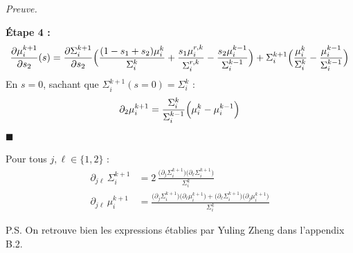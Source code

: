\documentclass[12pt]{article}
\renewcommand{\qedsymbol}{$\blacksquare$}
\renewenvironment{proof}[1][\proofname]{%
  \par\medskip\noindent
  \textit{\color{proofgray}#1.}\enspace\ignorespaces
}{\hfill\qedsymbol\par\medskip}
\renewcommand{\proofname}{Preuve}
\begin{document}
\begin{proof}
\noindent\textbf{Étape 4 :}
\begin{equation*}
\frac{\partial \mu_i^{k+1}}{\partial s_2}(s) = \frac{\partial \Sigma_i^{k+1}}{\partial s_2} \Bigl( 
    \frac{(1-s_1+s_2)\mu_i^k}{\Sigma_i^{k}} + \frac{s_1\mu_i^{r,k}}{\Sigma_i^{r,k}} - \frac{s_2\mu_i^{k-1}}{\Sigma_i^{k-1}} \Bigr) 
    + \Sigma_i^{k+1} \Bigl( 
        \frac{\mu_i^{k}}{\Sigma_i^{k}} - \frac{\mu_i^{k-1}}{\Sigma_i^{k-1}}
\Bigr)
\end{equation*}
En $s=0$, sachant que $\Sigma_i^{k+1}(s=0)= \Sigma_i^k$ :
\begin{equation*}
\partial_2 \mu_i^{k+1} = \frac{\Sigma_i^k}{\Sigma_i^{k-1}}\Bigl( \mu_i^k - \mu_i^{k-1}\Bigr)
\end{equation*}
\end{proof}


\begin{propositionbox}
\label{prop:deriv2}
Pour tous $j, \ell \in \{1, 2\}$ :
\begin{equation}
    \begin{aligned}
    \partial_{j\ell}\, \Sigma_i^{k+1} &= 2\,\frac{\bigl(\partial_j \Sigma_i^{k+1}\bigr)\bigl( \partial_{\ell} \Sigma_i^{k+1} \bigr) }{\Sigma_i^k}
     \\[6pt]
    \partial_{j\ell}\, \mu_i^{k+1} &= \frac{\bigl(\partial_j \Sigma_i^{k+1}\bigr) \bigl(\partial_{\ell} \mu_i^{k+1}\bigr) + \bigl(\partial_{\ell} \Sigma_i^{k+1}\bigr) \bigl(\partial_{j} \mu_i^{k+1}\bigr)}{\Sigma_i^k}
    \end{aligned}
\end{equation}

P.S. On retrouve bien les expressions établies par Yuling Zheng dans l'appendix B.2.
\end{propositionbox}
\end{document}
